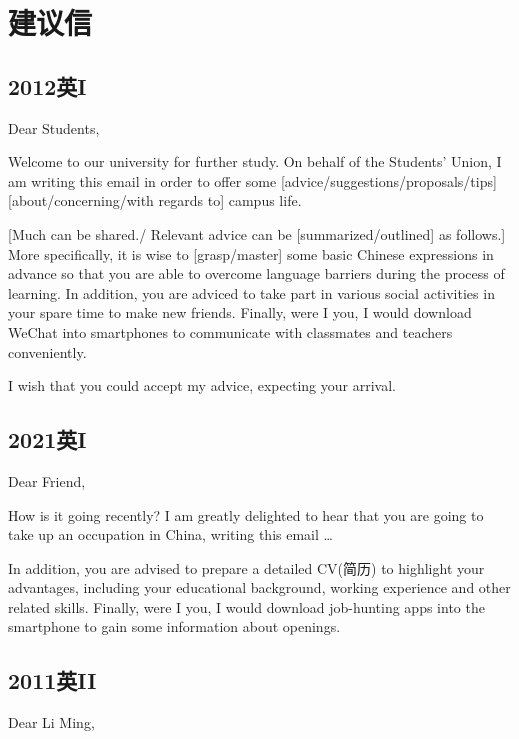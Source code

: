 \chapter{建议信}

\section{2012英I}

\noindent Dear Students,

Welcome to our university for further study. On behalf of the Students' Union, I am 
writing this email in order to offer some [advice/suggestions/proposals/tips]
[about/concerning/with regards to] campus life. 

[Much can be shared./ Relevant advice can be [summarized/outlined] as follows.]
More specifically, it is wise to [grasp/master] some basic Chinese expressions in advance
so that you are able to overcome language barriers during the process of learning.
In addition, you are adviced to take part in various social activities in your spare time to 
make new friends. Finally, were I you, I would download WeChat into smartphones to communicate with 
classmates and teachers conveniently.

I wish that you could accept my advice, expecting your arrival.

\YSLM

\section{2021英I}

\noindent Dear Friend,

How is it going recently? I am greatly delighted to hear that you are going to 
take up an occupation in China, writing this email \dots 

In addition, you are advised to prepare a detailed CV(简历) to highlight 
your advantages, including your educational background, working experience 
and other related skills.
Finally, were I you, I would download job-hunting apps into the smartphone to 
gain some information about openings. 

\YSLM

\newpage 

\section{2011英II}

Dear Li Ming,

